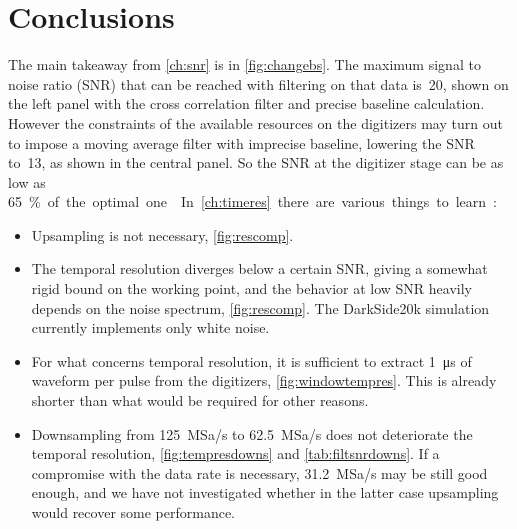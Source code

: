 \chapter{Conclusions}
\label{ch:end}

The main takeaway from \autoref{ch:snr} is in \autoref{fig:changebs}. The
maximum signal to noise ratio (SNR) that can be reached with filtering on that
data is~20, shown on the left panel with the cross correlation filter and
precise baseline calculation. However the constraints of the available
resources on the digitizers may turn out to impose a moving average filter with
imprecise baseline, lowering the SNR to~13, as shown in the central panel. So
the SNR at the digitizer stage can be as low as \SI{65}\% of the optimal one.


In \autoref{ch:timeres} there are various things to learn:

\begin{itemize}
    
    \item Upsampling is not necessary, \autoref{fig:rescomp}.
    
    \item The temporal resolution diverges below a certain SNR, giving a
    somewhat rigid bound on the working point, and the behavior at low SNR
    heavily depends on the noise spectrum, \autoref{fig:rescomp}. The
    DarkSide20k simulation currently implements only white noise.
    
    \item For what concerns temporal resolution, it is sufficient to extract
    \SI{1}{\micro s} of waveform per pulse from the digitizers,
    \autoref{fig:windowtempres}. This is already shorter than what would be
    required for other reasons.
    
    \item Downsampling from \SI{125}{MSa/s} to \SI{62.5}{MSa/s} does not
    deteriorate the temporal resolution, \autoref{fig:tempresdowns} and
    \autoref{tab:filtsnrdowns}. If a compromise with the data rate is
    necessary, \SI{31.2}{MSa/s} may be still good enough, and we have not
    investigated whether in the latter case upsampling would recover some
    performance.
    
\end{itemize}



